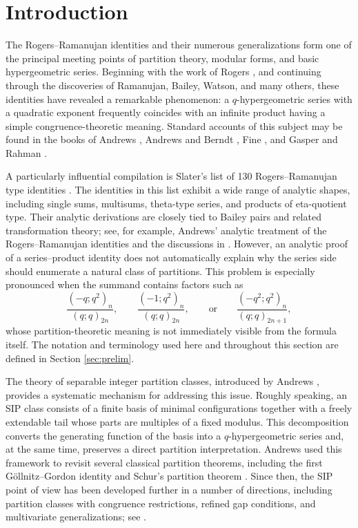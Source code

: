 \documentclass[11pt]{amsart}
\theoremstyle{definition}
\theoremstyle{remark}
\numberwithin{equation}{section}
\begin{document}
\maketitle
\section{Introduction}

The Rogers--Ramanujan identities and their numerous generalizations form one of the principal meeting points of partition theory, modular forms, and basic hypergeometric series. Beginning with the work of Rogers \cite{Rogers1894}, and continuing through the discoveries of Ramanujan, Bailey, Watson, and many others, these identities have revealed a remarkable phenomenon: a $q$-hypergeometric series with a quadratic exponent frequently coincides with an infinite product having a simple congruence-theoretic meaning. Standard accounts of this subject may be found in the books of Andrews \cite{A}, Andrews and Berndt \cite{AndrewsBerndt2005,AndrewsBerndt2009}, Fine \cite{Fine88}, and Gasper and Rahman \cite{GasperRahman2004}.

A particularly influential compilation is Slater's list of 130 Rogers--Ramanujan type identities \cite{Slater1952}. The identities in this list exhibit a wide range of analytic shapes, including single sums, multisums, theta-type series, and products of eta-quotient type. Their analytic derivations are closely tied to Bailey pairs and related transformation theory; see, for example, Andrews' analytic treatment of the Rogers--Ramanujan identities \cite{Andrews1974} and the discussions in \cite{A,AndrewsBerndt2005,AndrewsBerndt2009,Fine88,GasperRahman2004}. However, an analytic proof of a series--product identity does not automatically explain why the series side should enumerate a natural class of partitions. This problem is especially pronounced when the summand contains factors such as
\[
\frac{(-q;q^2)_n}{(q;q)_{2n}},
\qquad
\frac{(-1;q^2)_n}{(q;q)_{2n}},
\qquad\text{or}\qquad
\frac{(-q^2;q^2)_n}{(q;q)_{2n+1}},
\]
whose partition-theoretic meaning is not immediately visible from the formula itself. The notation and terminology used here and throughout this section are defined in Section \ref{sec:prelim}.

The theory of separable integer partition classes, introduced by Andrews \cite{AndrewsSIP}, provides a systematic mechanism for addressing this issue. Roughly speaking, an SIP class consists of a finite basis of minimal configurations together with a freely extendable tail whose parts are multiples of a fixed modulus. This decomposition converts the generating function of the basis into a $q$-hypergeometric series and, at the same time, preserves a direct partition interpretation. Andrews used this framework to revisit several classical partition theorems, including the first G\"ollnitz--Gordon identity and Schur's partition theorem \cite{AndrewsSIP}. Since then, the SIP point of view has been developed further in a number of directions, including partition classes with congruence restrictions, refined gap conditions, and multivariate generalizations; see \cite{ChenHeTangWei2024,HeHuangLiZhang2025,LiThesis2025}.
\end{document}
